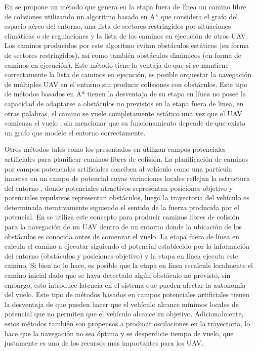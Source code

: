 En \cite{shi2018collision} se propone un método que genera en la etapa fuera de línea un camino libre de colisiones utilizando un algoritmo basado en A* que considera el grafo del espacio aéreo del entorno, una lista de sectores restringidos por situaciones climáticas o de regulaciones y la lista de los caminos en ejecución de otros UAV. Los caminos producidos por este algoritmo evitan obstáculos estáticos (en forma de sectores restringidos), así como también obstáculos dinámicos (en forma de caminos en ejecución). Este método tiene la ventaja de que si se mantiene correctamente la lista de caminos en ejecución, es posible orquestar la navegación de múltiples UAV en el entorno sin producir colisiones con obstáculos. Este tipo de métodos basados en A* tienen la desventaja de su etapa en línea no posee la capacidad de adaptarse a obstáculos no previstos en la etapa fuera de linea, en otras palabras, el camino se vuele completamente estático una vez que el UAV comienza el vuelo \cite{park2020boundary}; sin mencionar que su funcionamiento depende de que exista un grafo que modele el entorno correctamente.

Otros métodos tales como los presentados en \cite{lifen2016path} utilizan campos potenciales artificiales para planificar caminos libres de colisión. La planificación de caminos por campos potenciales artificiales conciben al vehículo como una partícula inmersa en un campo de potencial cuyas variaciones locales reflejan la estructura del entorno \cite{bermudez2004aplicacion}, donde potenciales atractivos representan posiciones objetivo y potenciales repulsivos representan obstáculos, luego la trayectoria del vehículo es determinada iterativamente siguiendo el sentido de la fuerza producida por el potencial. En \cite{lifen2016path} se utiliza este concepto para producir caminos libres de colisión para la navegación de un UAV dentro de un entorno donde la ubicación de los obstáculos es conocida antes de comenzar el vuelo. La etapa fuera de línea en \cite{lifen2016path} calcula el camino a ejecutar siguiendo el potencial establecido por la información del entorno (obstáculos y posiciones objetivo) y la etapa en línea ejecuta este camino. Si bien \cite{lifen2016path} no lo hace, es posible que la etapa en línea recalcule localmente el camino inicial dado que se haya detectado algún obstáculo no previsto, sin embargo, esto introduce latencia en el sistema que pueden afectar la autonomía del vuelo. Este tipo de métodos basados en campos potenciales artificiales tienen la desventaja de que pueden hacer que el vehículo alcance mínimos locales de potencial que no permiten que el vehículo alcance su objetivo. Adicionalmente, estos métodos también son propensos a producir oscilaciones en la trayectoria, lo hace que la navegación no sea óptima y se desperdicie tiempo de vuelo, que justamente es uno de los recursos mas importantes para los UAV.


